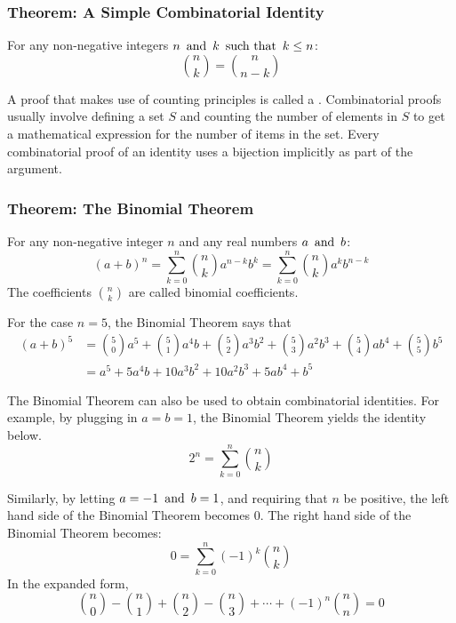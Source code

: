 \subsubsection*{Theorem: A Simple Combinatorial Identity}
For any non-negative integers $n \operatorname{~\text{and}~} k \operatorname{~\text{such that}~} k \leq n$:
\[
  \binom{n}{k} = \binom{n}{n-k}
\]

A proof that makes use of counting principles is called a . Combinatorial proofs usually involve defining a set $S$ and counting the number of elements in $S$ to get a mathematical expression for the number of items in the set. Every combinatorial proof of an identity uses a bijection implicitly as part of the argument.

\subsubsection*{Theorem: The Binomial Theorem}
For any non-negative integer $n$ and any real numbers $a \operatorname{~\text{and}~} b$:
\[
  (a + b)^n = \sum_{k=0}^{n} \binom{n}{k} a^{n-k}b^k = \sum_{k=0}^{n} \binom{n}{k} a^kb^{n-k}
\]
The coefficients $\binom{n}{k}$ are called binomial coefficients.

For the case $n = 5$, the Binomial Theorem says that
\begin{align*}
  (a+b)^5 & = \binom{5}{0}a^5 + \binom{5}{1}a^4b + \binom{5}{2}a^3b^2 + \binom{5}{3}a^2b^3 + \binom{5}{4}ab^4 + \binom{5}{5}b^5 \\
          & = a^5 + 5a^4b + 10a^3b^2 + 10a^2b^3 + 5ab^4 + b^5
\end{align*}

The Binomial Theorem can also be used to obtain combinatorial identities. For example, by plugging in $a=b=1$, the Binomial Theorem yields the identity below.
\[
  2^n = \sum_{k=0}^{n} \binom{n}{k}
\]

Similarly, by letting $a=-1 \operatorname{~\text{and}~} b=1$, and requiring that $n$ be positive, the left hand side of the Binomial Theorem becomes 0. The right hand side of the Binomial Theorem becomes:
\[
  0 = \sum_{k=0}^{n}(-1)^k \binom{n}{k}
\]
In the expanded form,
\[
  \binom{n}{0} - \binom{n}{1} + \binom{n}{2} - \binom{n}{3} + \cdots + (-1)^n \binom{n}{n} = 0
\]

